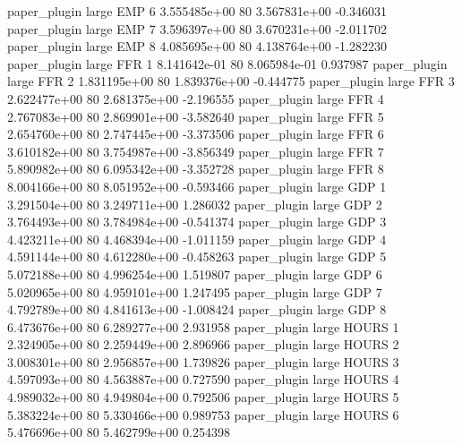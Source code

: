        paper_plugin      large      EMP                 6 3.555485e+00 80   3.567831e+00          -0.346031
       paper_plugin      large      EMP                 7 3.596397e+00 80   3.670231e+00          -2.011702
       paper_plugin      large      EMP                 8 4.085695e+00 80   4.138764e+00          -1.282230
       paper_plugin      large      FFR                 1 8.141642e-01 80   8.065984e-01           0.937987
       paper_plugin      large      FFR                 2 1.831195e+00 80   1.839376e+00          -0.444775
       paper_plugin      large      FFR                 3 2.622477e+00 80   2.681375e+00          -2.196555
       paper_plugin      large      FFR                 4 2.767083e+00 80   2.869901e+00          -3.582640
       paper_plugin      large      FFR                 5 2.654760e+00 80   2.747445e+00          -3.373506
       paper_plugin      large      FFR                 6 3.610182e+00 80   3.754987e+00          -3.856349
       paper_plugin      large      FFR                 7 5.890982e+00 80   6.095342e+00          -3.352728
       paper_plugin      large      FFR                 8 8.004166e+00 80   8.051952e+00          -0.593466
       paper_plugin      large      GDP                 1 3.291504e+00 80   3.249711e+00           1.286032
       paper_plugin      large      GDP                 2 3.764493e+00 80   3.784984e+00          -0.541374
       paper_plugin      large      GDP                 3 4.423211e+00 80   4.468394e+00          -1.011159
       paper_plugin      large      GDP                 4 4.591144e+00 80   4.612280e+00          -0.458263
       paper_plugin      large      GDP                 5 5.072188e+00 80   4.996254e+00           1.519807
       paper_plugin      large      GDP                 6 5.020965e+00 80   4.959101e+00           1.247495
       paper_plugin      large      GDP                 7 4.792789e+00 80   4.841613e+00          -1.008424
       paper_plugin      large      GDP                 8 6.473676e+00 80   6.289277e+00           2.931958
       paper_plugin      large    HOURS                 1 2.324905e+00 80   2.259449e+00           2.896966
       paper_plugin      large    HOURS                 2 3.008301e+00 80   2.956857e+00           1.739826
       paper_plugin      large    HOURS                 3 4.597093e+00 80   4.563887e+00           0.727590
       paper_plugin      large    HOURS                 4 4.989032e+00 80   4.949804e+00           0.792506
       paper_plugin      large    HOURS                 5 5.383224e+00 80   5.330466e+00           0.989753
       paper_plugin      large    HOURS                 6 5.476696e+00 80   5.462799e+00           0.254398
